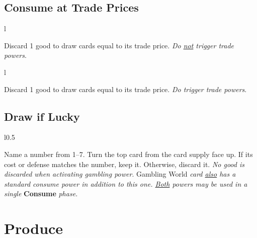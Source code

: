 \documentclass[letterpaper,landscape,twocolumn,8pt]{extarticle}
\begin{document}
\begin{minipage}[t]{\calc{1/3}\columnwidth}
\setlength{\intextsep}{0pt}%


\subsection*{\RaggedRight{}Consume at Trade Prices}
\begin{wrapfigure}{l}{\columnwidth}
    
\end{wrapfigure}

Discard 1 good to draw cards equal to its trade price.
\smallbreak{}
\textit{Do \underline{not} trigger trade powers}.


\begin{wrapfigure}{l}{\columnwidth}
    
\end{wrapfigure}


Discard 1 good to draw cards equal to its trade price.
\smallbreak{}
\textit{Do trigger trade powers}.

\subsection*{\RaggedRight{}Draw if Lucky}
\begin{wrapfigure}{l}{0.5\columnwidth}
    
\end{wrapfigure}

Name a number from 1--7. Turn the top card from the card supply face up. If
its cost or defense matches the number, keep it. Otherwise, discard it.
\smallbreak{}
\textit{No good is discarded when activating gambling power}.
\smallbreak{}
Gambling World
\textit{card \underline{also} has a standard consume power in addition to this
    one. \underline{Both}
powers may be used in a single} \textbf{Consume} \textit{phase.}





\end{minipage}

\section{Produce}%
\end{document}
